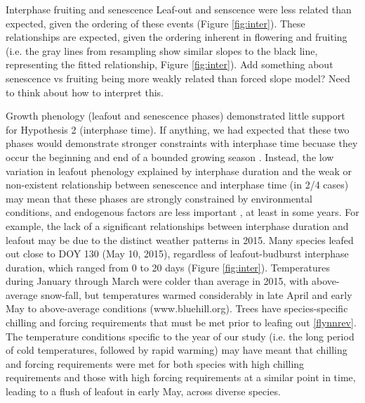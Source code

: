 \documentclass{article}
\begin{document}
\par Interphase fruiting and senescence Leaf-out and senscence were less related than expected, given the ordering of these events (Figure \ref{fig:inter}). These relationships are expected, given the ordering inherent in flowering and fruiting (i.e. the gray lines from resampling show similar slopes to the black line, representing the fitted relationship, Figure \ref{fig:inter}). 
Add something about senescence vs fruiting being more weakly related than forced slope model? Need to think about how to interpret this. 

\par Growth phenology (leafout and senescence phases) demonstrated little support for Hypothesis 2 (interphase time). If anything, we had expected that these two phases would demonstrate stronger constraints with interphase time becuase they occur the beginning and end of a bounded growing season \citep{letten2013}. Instead, the low variation in leafout phenology explained by interphase duration  and the weak or non-existent relationship between senescence and interphase time (in 2/4 cases) may mean that these phases are strongly constrained by environmental conditions, and endogenous factors are less important \citep{fenner1998}, at least in some years. For example, the lack of a significant relationships between interphase duration and leafout may be due to the distinct weather patterns in 2015. Many species leafed out close to DOY 130 (May 10, 2015), regardless of leafout-budburst interphase duration, which ranged from 0 to 20 days (Figure \ref{fig:inter}). Temperatures during January through March were colder than average in 2015, with above-average snow-fall, but temperatures warmed considerably in late April and early May to above-average conditions (www.bluehill.org). Trees have species-specific chilling and forcing requirements that must be met prior to leafing out \ref{flynnrev}. The temperature conditions specific to the year of our study (i.e. the long period of cold temperatures, followed by rapid warming) may have meant that chilling and forcing requirements were met for both species with high chilling requirements and those with high forcing requirements at a similar point in time, leading to a flush of leafout in early May, across diverse species. 
\end{document}
